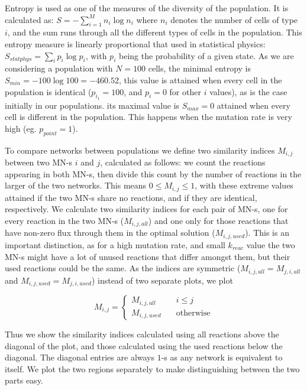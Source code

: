 \documentclass[a4paper,12pt]{article}
\begin{document}
Entropy is used as one of the measures of the diversity of the population. It is calculated as: $S=- \sum^{M}_{i=1} n_i \log n_i $ where $n_i$ denotes the number of cells of type $i$, and the sum runs through all the different types of cells in the population. This entropy measure is linearly proportional that used in statistical physics: $S_{statphys}=\sum_i p_i \log p_i$, with $p_i$ being the probability of a given state. As we are considering a population with $N=100$ cells, the minimal entropy is $S_{min}=-100\log100=-460.52$, this value is attained when every cell in the population is identical ($p_{i_1}=100$, and $p_i=0$ for other $i$ values), as is the case initially in our populations. its maximal value is $S_{max}=0$ attained when every cell is different in the population. This happens when the mutation rate is very high (eg. $p_{point}=1$). 


To compare networks between populations we define two similarity indices $M_{i,j}$ between two MN-s $i$ and $j$, calculated as follows: we count the reactions appearing in both MN-s, then divide this count by the number of reactions in the larger of the two networks. This means $0\leq M_{i,j} \leq 1$, with these extreme values attained if the two MN-s share no reactions, and if they are identical, respectively. We calculate two similarity indices for each pair of MN-s, one for every reaction in the two MN-s ($M_{i,j,all}$) and one only for those reactions that have non-zero flux through them in the optimal solution ($M_{i,j,used}$). This is an important distinction, as for a high mutation rate, and small $k_{reac}$ value the two MN-s might have a lot of unused reactions that differ amongst them, but their used reactions could be the same. As the indices are symmetric ($M_{i,j,all}=M_{j,i,all}$ and $M_{i,j,used}=M_{j,i,used}$) instead of two separate plots, we plot 

$$
M_{i,j}= \left\{
	\begin{array}{ll}
		M_{i,j,all} & \quad i \leq j \\
		M_{i,j,used} & \quad \text{otherwise}
	\end{array}
\right.
$$

Thus we show the similarity indices calculated using all reactions above the diagonal of the plot, and those calculated using the used reactions below the diagonal. The diagonal entries are always $1$-s as any network is equivalent to itself. We plot the two regions separately to make distinguishing between the two parts easy.
\end{document}

